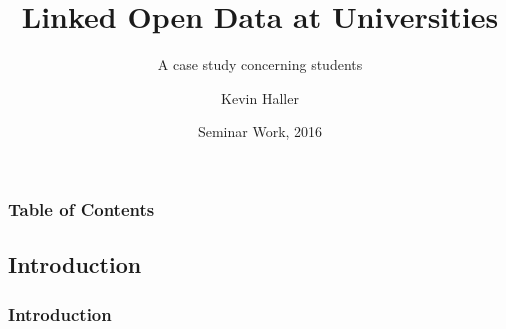 \documentclass{beamer}
\begin{document}
\title[LOD] %
{Linked Open Data at Universities}
\subtitle{A case study concerning students}
\author[Author, Haller] %
{Kevin Haller}

\date[2016] %
{Seminar Work, 2016}
\subject{Computer Science}

\frame{\titlepage}

\begin{frame}
\frametitle{Table of Contents}
\tableofcontents[currentsection]
\end{frame}


\begin{frame}
\section{Introduction}
\frametitle{Introduction}
\end{frame}
\end{document}
